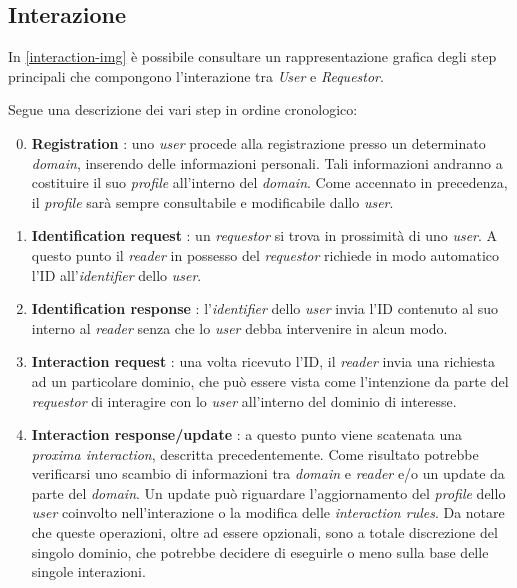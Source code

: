 \documentclass[a4paper,12pt]{report}
\begin{document}
\subsection{Interazione}

In \autoref{interaction-img} è possibile consultare un rappresentazione grafica degli step principali che compongono l'interazione tra \emph{User} e \emph{Requestor}.

Segue una descrizione dei vari step in ordine cronologico:
\begin{enumerate}
	\setcounter{enumi}{-1}
	\item \textbf{Registration} : uno \emph{user} procede alla registrazione presso un determinato \emph{domain}, inserendo delle informazioni personali. Tali informazioni andranno a costituire il suo \emph{profile} all'interno del \emph{domain}. Come accennato in precedenza, il \emph{profile} sarà sempre consultabile e modificabile dallo \emph{user}.
	\item \textbf{Identification request} : un \emph{requestor} si trova in prossimità di uno \emph{user}. A questo punto il \emph{reader} in possesso del \emph{requestor} richiede in modo automatico l'ID all'\emph{identifier} dello \emph{user}.
	\item \textbf{Identification response} : l'\emph{identifier} dello \emph{user} invia l'ID contenuto al suo interno al \emph{reader} senza che lo \emph{user} debba intervenire in alcun modo.
	\item \textbf{Interaction request} : una volta ricevuto l'ID, il \emph{reader} invia una richiesta ad un particolare dominio, che può essere vista come l'intenzione da parte del \emph{requestor} di interagire con lo \emph{user} all'interno del dominio di interesse.
	\item \textbf{Interaction response/update} : a questo punto viene scatenata una \emph{proxima interaction}, descritta precedentemente. Come risultato potrebbe verificarsi uno scambio di informazioni tra \emph{domain} e \emph{reader} e/o un update da parte del \emph{domain}. Un update può riguardare l'aggiornamento del \emph{profile} dello \emph{user} coinvolto nell'interazione o la modifica delle \emph{interaction rules}. Da notare che queste operazioni, oltre ad essere opzionali, sono a totale discrezione del singolo dominio, che potrebbe decidere di eseguirle o meno sulla base delle singole interazioni.
\end{enumerate} 
\end{document}
